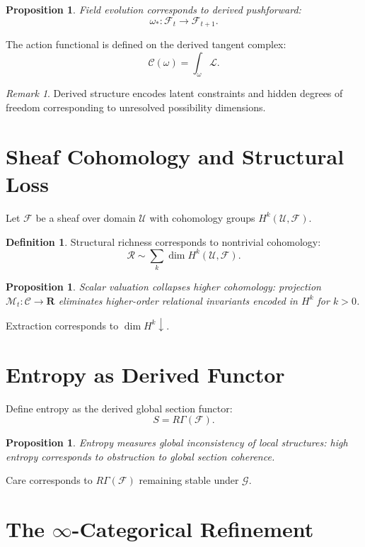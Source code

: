 \documentclass[11pt,a4paper]{article}
\newtheorem{proposition}[theorem]{Proposition}
\theoremstyle{definition}
\newtheorem{definition}[theorem]{Definition}
\theoremstyle{remark}
\newtheorem{remark}[theorem]{Remark}
\begin{document}
\begin{proposition}
Field evolution corresponds to derived pushforward:
\[
\omega_* : \mathcal{F}_t \to \mathcal{F}_{t+1}.
\]
\end{proposition}

The action functional is defined on the derived tangent complex:
\[
\mathcal{C}(\omega) = \int_\omega \mathcal{L}.
\]

\begin{remark}
Derived structure encodes latent constraints and hidden degrees of freedom corresponding to unresolved possibility dimensions.
\end{remark}

\section{Sheaf Cohomology and Structural Loss}

Let $\mathcal{F}$ be a sheaf over domain $\mathcal{U}$ with cohomology groups $H^k(\mathcal{U}, \mathcal{F})$.

\begin{definition}
Structural richness corresponds to nontrivial cohomology:
\[
\mathcal{R} \sim \sum_k \dim H^k(\mathcal{U}, \mathcal{F}).
\]
\end{definition}

\begin{proposition}
Scalar valuation collapses higher cohomology: projection $\mathcal{M}_t : \mathcal{C} \to \mathbf{R}$ eliminates higher-order relational invariants encoded in $H^k$ for $k > 0$.
\end{proposition}

Extraction corresponds to $\dim H^k \downarrow$.

\section{Entropy as Derived Functor}

Define entropy as the derived global section functor:
\[
S = R\Gamma(\mathcal{F}).
\]

\begin{proposition}
Entropy measures global inconsistency of local structures: high entropy corresponds to obstruction to global section coherence.
\end{proposition}

Care corresponds to $R\Gamma(\mathcal{F})$ remaining stable under $\mathcal{G}$.

\section{The $\infty$-Categorical Refinement}
\end{document}

